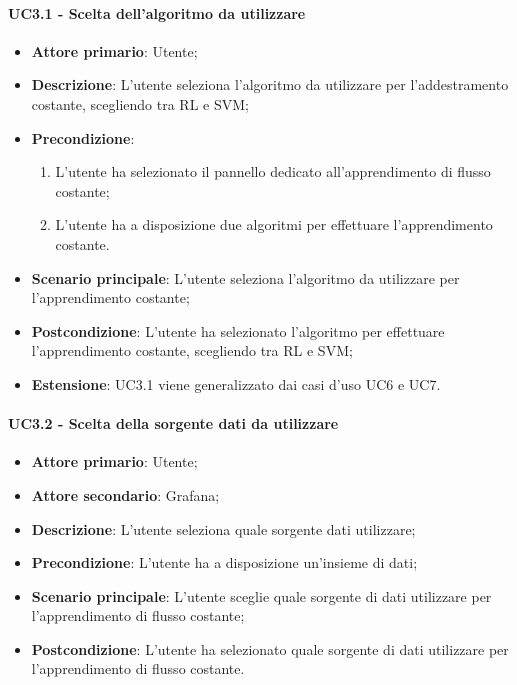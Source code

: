 \paragraph{UC3.1 - Scelta dell'algoritmo da utilizzare}
\label{para:uc3.1}
\begin{itemize}
  \item \textbf{Attore primario}: Utente;
  \item \textbf{Descrizione}: L'utente seleziona l'algoritmo da utilizzare per l'addestramento costante, scegliendo tra RL e SVM;
  \item \textbf{Precondizione}:
  \begin{enumerate}
    \item L'utente ha selezionato il pannello dedicato all'apprendimento di flusso costante;
    \item L'utente ha a disposizione due algoritmi per effettuare l'apprendimento costante.
  \end{enumerate}
  \item \textbf{Scenario principale}: L'utente seleziona l'algoritmo da utilizzare per l'apprendimento costante;
  \item \textbf{Postcondizione}: L'utente ha selezionato l'algoritmo per effettuare l'apprendimento costante, scegliendo tra RL e SVM;
  \item \textbf{Estensione}: UC3.1 viene generalizzato dai casi d'uso UC6 e UC7.
\end{itemize}

\paragraph{UC3.2 - Scelta della sorgente dati da utilizzare}
\label{para:uc3.2}
\begin{itemize}
  \item \textbf{Attore primario}: Utente;
  \item \textbf{Attore secondario}: Grafana;
  \item \textbf{Descrizione}: L'utente seleziona quale sorgente dati utilizzare;
  \item \textbf{Precondizione}: L'utente ha a disposizione un'insieme di dati;
  \item \textbf{Scenario principale}: L'utente sceglie quale sorgente di dati utilizzare per l'apprendimento di flusso costante;
  \item \textbf{Postcondizione}: L'utente ha selezionato quale sorgente di dati utilizzare per l'apprendimento di flusso costante.
\end{itemize}

